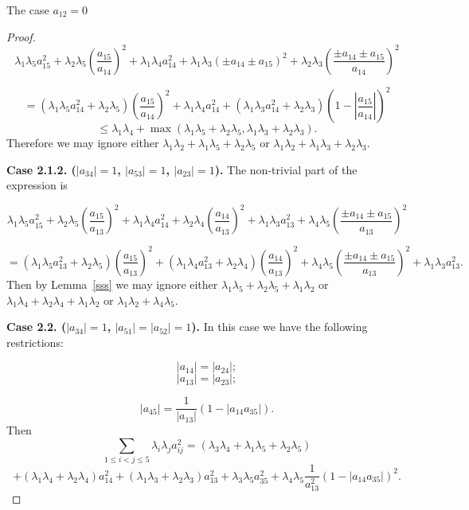 \documentclass[12pt]{article}
\begin{document}
\begin{section}{The case \texorpdfstring{$a_{12} = 0$}{Lg}}
\begin{proof}
            $$     
    \lambda_{1}\lambda_{5}a_{15}^2 + \lambda_{2}\lambda_{5}\left(\frac{a_{15}}{a_{14}}\right)^2 + \lambda_{1}\lambda_{4}a_{14}^2 + \lambda_{1}\lambda_{3}(\pm a_{14} \pm a_{15})^2 + \lambda_{2}\lambda_{3}\left(\frac{\pm a_{14}\pm a_{15}}{a_{14}}\right)^2 $$

    $$     
    = (\lambda_{1}\lambda_{5}a_{14}^2 + \lambda_{2}\lambda_{5})\left(\frac{a_{15}}{a_{14}}\right)^2 + \lambda_{1}\lambda_{4}a_{14}^2 + (\lambda_{1}\lambda_{3}a_{14}^2 + \lambda_{2}\lambda_{3})\left(1 - \left |\frac{ a_{15}}{a_{14}}\right|\right)^2 $$
    $$
        \leq \lambda_{1}\lambda_{4} + \max (\lambda_{1}\lambda_{5} + \lambda_{2}\lambda_{5}, \lambda_{1}\lambda_{3}+
        \lambda_{2}\lambda_{3}).
    $$
    Therefore we may ignore either $\lambda_{1}\lambda_{2} +\lambda_{1}\lambda_{5} + \lambda_{2}\lambda_{5} $ or $\lambda_{1}\lambda_{2} + \lambda_{1}\lambda_{3} + \lambda_{2}\lambda_{3}$.
        
 



     \textbf{Case 2.1.2. ($|a_{34}|=1$, $|a_{53}|=1$, $|a_{23}|=1$).} The non-trivial part of the expression is 

        $$     
\lambda_{1}\lambda_{5}a_{15}^2  + \lambda_{2}\lambda_{5}\left(\frac{a_{15}}{a_{13}}\right)^2 + \lambda_{1}\lambda_{4}a_{14}^2 + \lambda_{2}\lambda_{4} \left(\frac{a_{14}}{a_{13}}\right)^2 + \lambda_{1}\lambda_{3}a_{13}^2  +\lambda_{4}\lambda_{5}\left(\frac{\pm a_{14} \pm a_{15}}{a_{13}}\right)^2   $$

$$
    = (\lambda_{1}\lambda_{5}a_{13}^2  + \lambda_{2}\lambda_{5})\left(\frac{a_{15}}{a_{13}}\right)^2 + (\lambda_{1}\lambda_{4}a_{13}^2 + \lambda_{2}\lambda_{4}) \left(\frac{a_{14}}{a_{13}}\right)^2  +\lambda_{4}\lambda_{5}\left(\frac{\pm a_{14} \pm a_{15}}{a_{13}}\right)^2 + \lambda_{1}\lambda_{3}a_{13}^2. 
$$
Then by Lemma~\ref{sss} we may ignore  either $\lambda_{1}\lambda_{5} + \lambda_{2}\lambda_{5} + \lambda_{1}\lambda_{2}$ or $\lambda_{1}\lambda_{4} + \lambda_{2}\lambda_{4} + \lambda_{1}\lambda_{2}$ or  $\lambda_{1}\lambda_{2} + \lambda_{4}\lambda_{5}$.

    \textbf{Case 2.2. ($|a_{34}|=1$, $|a_{51}|=|a_{52}|=1$).} In this case we have the following restrictions:

    $$
            |a_{14}|=|a_{24}|; 
        $$
        $$
            |a_{13}|=|a_{23}|;
        $$

        $$
            |a_{45}| = \frac{1}{|a_{13}|}(1 - |a_{14}a_{35}|).
        $$
    Then 
    $$
        \sum_{1\leq i < j \leq 5} \lambda_{i}\lambda_{j}a_{ij}^2 = (\lambda_{3}\lambda_{4} + \lambda_{1}\lambda_{5} + \lambda_{2}\lambda_{5})  $$
        $$     
 + (\lambda_{1}\lambda_{4} + \lambda_{2}\lambda_{4})a_{14}^2 + (\lambda_{1}\lambda_{3} + \lambda_{2}\lambda_{3})a_{13}^2 + \lambda_{3}\lambda_{5}a_{35}^2 +\lambda_{4}\lambda_{5}\frac{1}{a_{13}^2}(1-|a_{14}a_{35}|)^2.   $$


\end{proof}
\end{section}
\end{document}
